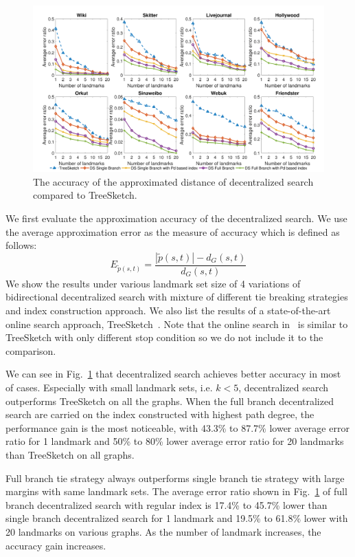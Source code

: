 \begin{figure}[ht]
    \centering
    \includegraphics[width=\linewidth]{./figures/accuracy_stepy.pdf}
    \caption{The accuracy of the approximated distance of decentralized search compared to TreeSketch.}
    \label{fig:accuracy_stepy}
\end{figure}

We first evaluate the approximation accuracy of the decentralized search. We use the average approximation error as the measure of accuracy which is defined as follows:
\[
E_{\tilde{p}(s,t)} = \frac{|\tilde{p}(s,t)| - d_G(s,t)}{d_G(s,t)}
\]
We show the results under various landmark set size of 4 variations of bidirectional decentralized search with mixture of different tie breaking strategies and index construction approach. We also list the results of a state-of-the-art online search approach, TreeSketch~\cite{Gubichev:2010:FAE:1871437.1871503}. Note that the online search in~\cite{6399472} is similar to TreeSketch with only different stop condition so we do not include it to the comparison. 

We can see in Fig.~\ref{fig:accuracy_stepy} that decentralized search achieves better accuracy in most of cases. Especially with small landmark sets, i.e. $k < 5$, decentralized search outperforms TreeSketch on all the graphs. When the full branch decentralized search are carried on the index constructed with highest path degree, the performance gain is the most noticeable, with 43.3\% to 87.7\% lower average error ratio for 1 landmark and 50\% to 80\% lower average error ratio for 20 landmarks than TreeSketch on all graphs.

Full branch tie strategy always outperforms single branch tie strategy with large margins with same landmark sets. The average error ratio shown in Fig.~\ref{fig:accuracy_stepy} of full branch decentralized search with regular index is 17.4\% to 45.7\% lower than single branch decentralized search for 1 landmark and 19.5\% to 61.8\% lower with 20 landmarks on various graphs. As the number of landmark increases, the accuracy gain increases.   

